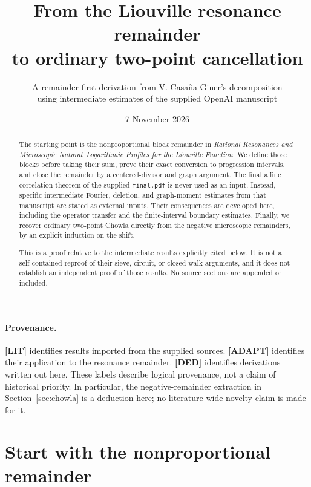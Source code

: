 \documentclass[11pt,a4paper]{article}
\title{From the Liouville resonance remainder\\to ordinary two-point cancellation}
\author{A remainder-first derivation from V. Casa\~na-Giner's decomposition\\
using intermediate estimates of the supplied OpenAI manuscript}
\date{7 November 2026}
\numberwithin{equation}{section}
\theoremstyle{remark}\newtheorem{remark}[theorem]{Remark}
\newcommand{\1}{\mathbf 1}
\begin{document}
\maketitle
\begin{abstract}
The starting point is the nonproportional block remainder in
\emph{Rational Resonances and Microscopic Natural--Logarithmic Profiles for
the Liouville Function}. We define those blocks before taking their sum,
prove their exact conversion to progression intervals, and close the
remainder by a centered-divisor and graph argument. The final affine
correlation theorem of the supplied \texttt{final.pdf} is never used as
an input. Instead, specific intermediate Fourier, deletion, and graph-moment
estimates from that manuscript are stated as external inputs. Their
consequences are developed here, including the operator transfer and
the finite-interval boundary estimates. Finally, we recover ordinary
two-point Chowla directly from the negative microscopic remainders,
by an explicit induction on the shift.

This is a proof relative to the intermediate results explicitly cited
below. It is not a self-contained reproof of their sieve, circuit, or
closed-walk arguments, and it does not establish an independent proof
of those results. No source sections are appended or included.
\end{abstract}

\paragraph{Provenance.}
\textbf{[LIT]} identifies results imported from the supplied sources.
\textbf{[ADAPT]} identifies their application to the resonance remainder.
\textbf{[DED]} identifies derivations written out here. These labels describe
logical provenance, not a claim of historical priority. In particular,
the negative-remainder extraction in Section~\ref{sec:chowla} is a
deduction here; no literature-wide novelty claim is made for it.

\tableofcontents

\section{Start with the nonproportional remainder}
\label{sec:remainder}
\end{document}
